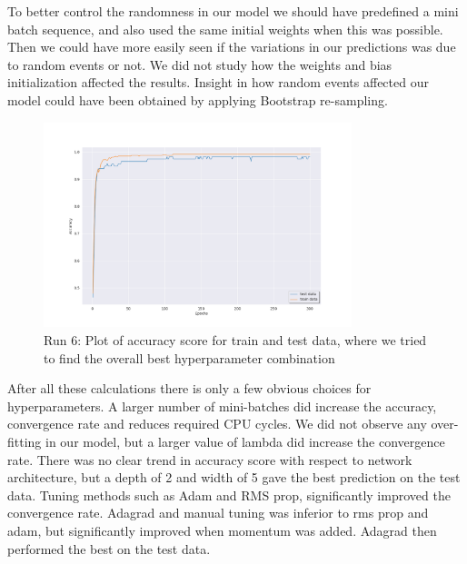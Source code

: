 To better control the randomness in our model we should have predefined a
mini batch sequence, and also used the same initial weights when this was
possible. Then we could have more easily seen if the variations in our
predictions was due to random events or not. We did not study how the weights
and bias initialization affected the results. Insight in how random events
affected our model could have been obtained by applying Bootstrap re-sampling. 

\begin{figure}[H]
    \centering
    \includegraphics[width=0.8\textwidth]{Figures/PartD/d_line_best.png}
    \caption{Run 6: Plot of accuracy score for train and test data, where we
    tried to find the overall best hyperparameter combination}  
    \label{fig:d_line_best} 
\end{figure}


After all these calculations there is only a few obvious choices for
hyperparameters. A larger number of mini-batches did increase the accuracy,
convergence rate and reduces required CPU cycles. We did not observe any over-fitting in 
our model, but a larger value of lambda did increase the convergence rate.
There was no clear trend in accuracy score with respect to network
architecture, but a depth of 2 and width of 5 gave the best prediction on the
test data. Tuning methods such as Adam and RMS prop, significantly improved the
convergence rate. Adagrad and manual tuning was inferior to rms prop and adam,
but significantly improved when momentum was added. Adagrad then performed the
best on the test data. 


                            

